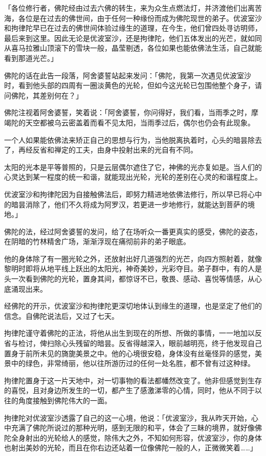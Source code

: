 \documentclass[12pt,twoside,openany]{book}
\begin{document}
「各位修行者，佛陀经由过去六佛的转生，来为众生点燃法灯，并济渡他们出离苦海，各位是在过去的佛世间，由于任何一种缘份而成为佛陀现世的弟子。优波室沙和拘律陀早已在过去的佛世间体验过缘生的道理，在今生，他们曾四处寻访明师，最后来到这里。因此无论是优波室沙，还是拘律陀，他们五体发出的光芒，就如同从喜马拉雅山顶滚下的雪块一般，晶莹剔透，各位如果也能依佛法生活，自己就能看到那道光芒。」

佛陀的话在此告一段落，阿舍婆誓站起来发问：「佛陀，我第一次遇见优波室沙时，看到他头部的四周有一圈淡黄色的光轮，但如今这光轮已包围他整个身子，请问佛陀，其差别何在？」

佛陀注视着阿舍婆誓，笑着说：「阿舍婆誓，你问得好，我们看，当雨季之时，摩竭陀的天空都被乌云密盖着而看不见太阳，当雨季过后，偶尔也仍会有此现象。

一个人如果能依佛法来矫正自己的思想与行为，当他脱离执着时，心头的暗昙除去了，再经反省和禅定的工夫，由身中投射出来的光自有不同。

太阳的光本是平等普照的，只是云层偶尔遮住了它，神佛的光亦复如是。当人们的心灵达到某一程度的统一和谐，就能现出光轮，光轮的差别在心灵的和谐程度上。

优波室沙和拘律陀因为自接触佛法后，即努力精进地依佛法修行，所以早已将心中的暗昙消除了，他们不久将成为阿罗汉，若更进一步地修行，就能达到菩萨的境地。」

佛陀的法，经过阿舍婆誓的发问，给了在场听众一番更真实的感受，佛陀的姿态，在阴暗的竹林精舍广场，渐渐浮现在痛彻前非的弟子眼底。

他的身体除了有一圈光轮之外，还放射出好几道强烈的光芒，向四方照射着，就像黎明时即将从地平线上跃出的太阳光，神奇美妙，光彩夺目。弟子群中，有的人是头一次看到佛陀的光轮，置身其间，都惊讶不已，敬畏、感动、喜悦等情感，从心底涌现出来。

经佛陀的开示，优波室沙和拘律陀更深切地体认到缘生的道理，也是坚定了他们的信念。自佛陀说法后，又过了七天。

拘律陀谨守着佛陀的正法，将他从出生到现在的所想、所做的事情，一一地加以反省与检讨，俾扫除心头残留的暗昙。反省得越深入，眼前越明亮，终于他发现自己置身于前所未见的旖旎美景之中。他的心境很安稳，身体没有丝毫怪异的感觉，美景中的绿色，非常绮丽，他以往所游历过的任何一处名胜，都不曾有过这种绿。

拘律陀置身于这一片天地中，对一切事物的看法都幡然改变了。他非但感觉到生存的喜悦，且对身边所发生的一切，都产生了感激涕零的心情，同时，他从不同于以往的角度接触到佛陀伟大的一面。

拘律陀对优波室沙透露了自己的这一心境，他说：「优波室沙，我从昨天开始，心中充满了佛陀所说过的那种光明，感到无限的和平，体会了三眛的境界，就好像佛陀全身射出的光轮给人的感觉，除伟大之外，不知如何形容，优波室沙，你的身体也射出美妙的光轮，而且在你右边还站着一位像佛陀一般的人，正微微笑着……」
\end{document}
